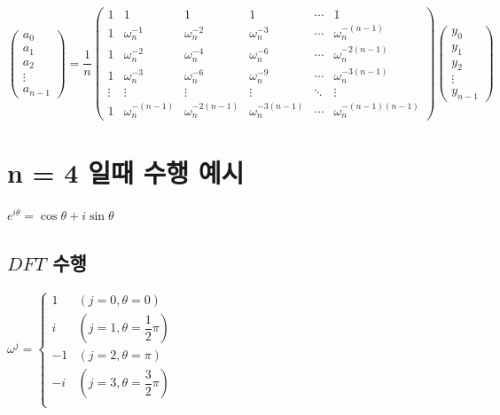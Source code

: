 $
\begin{pmatrix}
    a_0 \\ 
    a_1 \\
    a_2 \\
    \vdots \\
    a_{n-1}
\end{pmatrix}
= \dfrac{1}{n}
\begin{pmatrix}
    1 & 1 & 1 & 1 & \cdots & 1 \\
    1 & \omega_n^{-1} & \omega_n^{-2} & \omega_n^{-3} & \cdots & \omega_n^{-(n-1)} \\
    1 & \omega_n^{-2} & \omega_n^{-4} & \omega_n^{-6} & \cdots & \omega_n^{-2(n-1)} \\
    1 & \omega_n^{-3} & \omega_n^{-6} & \omega_n^{-9} & \cdots & \omega_n^{-3(n-1)} \\
    \vdots & \vdots & \vdots & \vdots & \ddots & \vdots \\
    1 & \omega_n^{-(n-1)} & \omega_n^{-2(n-1)} & \omega_n^{-3(n-1)} & \cdots & \omega_n^{-(n-1)(n-1)} 
\end{pmatrix}
\begin{pmatrix}
    y_0 \\ 
    y_1 \\
    y_2 \\
    \vdots \\
    y_{n-1}
\end{pmatrix}
$

\section{n = 4 일때 수행 예시}

$e^{i\theta} = \cos \theta + i \sin \theta$



\subsection{$DFT$ 수행}

$
\omega^j = \left\{
\begin{array}{rl}
    1 & ( j = 0, \theta = 0 ) \\
    i & ( j = 1, \theta = \dfrac{1}{2}\pi) \\
    -1 & ( j = 2, \theta = \pi )\\
    -i & ( j = 3, \theta = \dfrac{3}{2}\pi) \\
\end{array}
\right.
$


